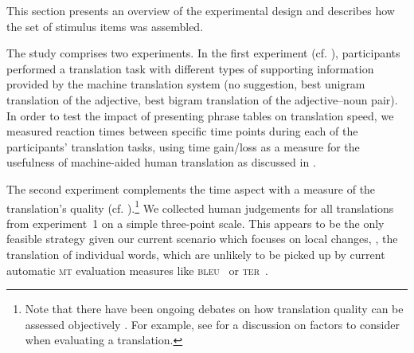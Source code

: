 \documentclass[output=paper]{LSP/langsci}
\begin{document}

This section presents an overview of the experimental design and
describes how the set of stimulus items was assembled. 

The study comprises two experiments. In the first experiment (cf. ),
participants performed a translation task with different types of
supporting information provided by the machine translation system (no
suggestion, best unigram translation of the adjective, best bigram
translation of the adjective--noun pair). In order to test the impact
of presenting phrase tables on translation speed, we measured reaction
times between specific time points during each of the participants'
translation tasks, using time gain/loss as a measure for the
usefulness of machine-aided human translation as discussed in
\cite{Gow:03}.


%

The second experiment complements the time aspect with a measure of
the translation's quality (cf. ).\footnote{Note that there have been ongoing
  debates on how translation quality can be assessed objectively
  \cite{House:98}. For example, see \cite{Reiss:1971} for a
  discussion on factors to consider when evaluating a translation.}
We collected human judgements for all translations from experiment~1
on a simple three-point scale. This appears to be the only feasible
strategy given our current scenario which focuses on local changes,
\ie, the translation of individual words, which are unlikely to be
picked up by current automatic \textsc{mt} evaluation measures like
\textsc{bleu}~\citep{Papineni:02} or \textsc{ter}~\citep{ter}.
\end{document}

